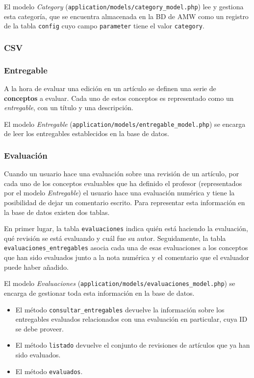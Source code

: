 \documentclass[11pt]{article}
\begin{document}
El modelo \textit{Category} (\texttt{application/models/category\_model.php})
lee y gestiona esta categoría, que se encuentra almacenada en la BD de AMW como
un registro de la tabla \texttt{config} cuyo campo \texttt{parameter} tiene el
valor \texttt{category}.

\subsubsection{CSV}

\subsubsection{Entregable}

A la hora de evaluar una edición en un artículo se definen una serie de
\textbf{conceptos} a evaluar. Cada uno de estos conceptos es representado como
un \textit{entregable}, con un título y una descripción.

El modelo \textit{Entregable}
(\texttt{application/models/entregable\_model.php}) se encarga de leer los
entregables establecidos en la base de datos.

\subsubsection{Evaluación}

Cuando un usuario hace una evaluación sobre una revisión de un artículo, por
cada uno de los conceptos evaluables que ha definido el profesor (representados
por el modelo \textit{Entregable}) el usuario hace una evaluación numérica y
tiene la posibilidad de dejar un comentario escrito. Para representar esta
información en la base de datos existen dos tablas. 

En primer lugar, la tabla \texttt{evaluaciones} indica quién está haciendo la
evaluación, qué revisión se está evaluando y cuál fue su autor. Seguidamente, la
tabla \texttt{evaluaciones\_entregables} asocia cada una de esas evaluaciones a
los conceptos que han sido evaluados junto a la nota numérica y el comentario
que el evaluador puede haber añadido.

El modelo \textit{Evaluaciones}
(\texttt{application/models/evaluaciones\_model.php}) se encarga de gestionar
toda esta información en la base de datos. 

\begin{itemize}
\item El método \texttt{consultar\_entregables} devuelve la información sobre
  los entregables evaluados relacionados con una evaluación en particular, cuya
  ID se debe proveer.
\item El método \texttt{listado} devuelve el conjunto de revisiones de artículos
  que ya han sido evaluados.
\item El método \texttt{evaluados}.
\end{itemize}
\end{document}
